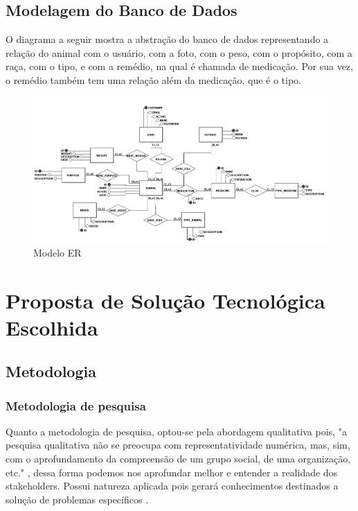 \documentclass[12pt]{article}
\begin{document}
	\newpage

	\subsection{Modelagem do Banco de Dados}

	O diagrama a seguir mostra a abstração do banco de dados representando a relação do animal com o usuário, com a foto, com o peso, com o propósito, com a raça, com o tipo, e com a remédio, na qual é chamada de medicação. Por sua vez, o remédio também tem uma relação além da medicação, que é o tipo.  

	\begin{figure}[!h]
		\begin{center}
			\caption{Modelo ER}
			\includegraphics[width=6in]{img/erdoboi.jpeg}


		\end{center}
	\end{figure}

	\newpage

	\section{Proposta de Solução Tecnológica Escolhida}

	\subsection{Metodologia}
    
    \subsubsection{Metodologia de pesquisa}

	Quanto a metodologia de pesquisa, optou-se pela abordagem qualitativa pois, "a pesquisa qualitativa não se preocupa com representatividade numérica, mas, sim, com o aprofundamento da compreensão de um grupo social, de uma organização, etc." \cite{ufrgs09}, dessa forma podemos nos aprofundar melhor e entender a realidade dos stakeholders. Possui natureza aplicada pois gerará conhecimentos destinados a solução de problemas específicos \cite{ufrgs09} .
\end{document}
